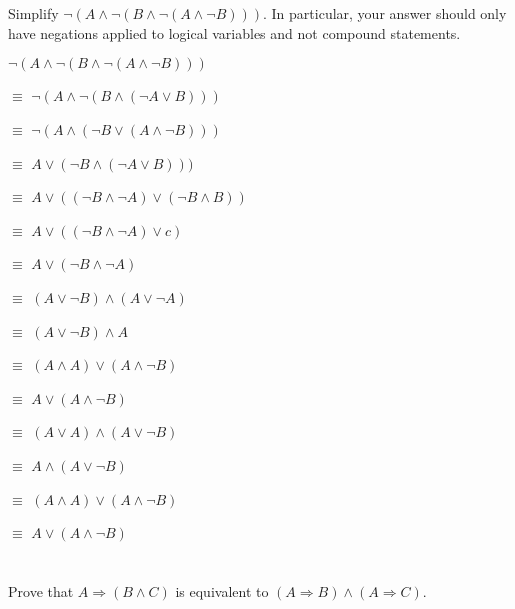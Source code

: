 \documentclass{article}
\begin{document}
\section{}
    Simplify \(\neg(A\wedge\neg(B\wedge\neg(A\wedge\neg B)))\). In particular, your answer should only have negations applied to logical variables and not compound statements.
    \begin{steps}
    \item \(\neg(A\wedge\neg(B\wedge\neg(A\wedge\neg B)))\) 
    \item $\equiv$ \(\neg(A\wedge\neg(B\wedge(\neg A\vee B)))\) 
    \item $\equiv$ \(\neg(A\wedge(\neg B\vee(A \wedge \neg B)))\) 
    \item $\equiv$ \(A\vee(\neg B\wedge(\neg A\vee B)))\) 
    \item $\equiv$ $A\vee((\neg B\land \neg A)\lor(\neg B \land B))$
    \item $\equiv$ $A\vee((\neg B \land \neg A)\lor c)$
    \item $\equiv$ $A\vee(\neg B\land\neg A)$
    \item $\equiv$ $(A\vee\neg B)\land(A\vee\neg A)$
    \item $\equiv$ $(A\vee\neg B)\land A$
    \item $\equiv$ $(A\land A)\lor(A\land\neg B)$
    \item $\equiv$ $A\lor(A\land\neg B)$
    \item $\equiv$ $(A\lor A)\land(A\lor\neg B)$
    \item $\equiv$ $A\land(A\lor\neg B)$
    \item $\equiv$ $(A\land A)\lor(A\land\neg B)$
    \item $\equiv$ $A\lor(A\land\neg B)$
   \end{steps}
   \section{}
    Prove that \(A\Rightarrow(B\wedge C)\) is equivalent to \((A\Rightarrow B)\wedge(A\Rightarrow C)\).
    
\end{document}
